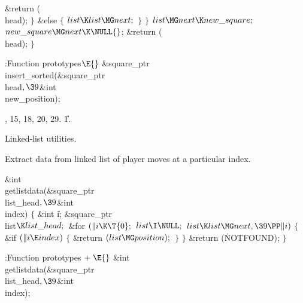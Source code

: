 \&{return} (\\{head});\6
\4${}\}{}$\2\6
\&{else}\5
${}\{{}$\1\6
${}\\{list}\K\\{list}\MG\\{next};{}$\6
\4${}\}{}$\2\6
\4${}\}{}$\2\6
${}\\{list}\MG\\{next}\K\\{new\_square};{}$\6
${}\\{new\_square}\MG\\{next}\K\NULL{}$;\6
\&{return} (\\{head});\6
\4${}\}{}$\2\par
\fi

\B{}:Function prototypes\X${}\E{}$\6
\&{square\_ptr} \\{insert\_sorted}(\&{square\_ptr} \\{head}${},\39{}$\&{int} %
\\{new\_position});\par
{}, 15, 18, 20, 29.
\U1.\fi

Linked-list utilities.

\fi

Extract data from linked list of player moves at a particular index.

\Y\B\&{int} \\{getlistdata}(\&{square\_ptr} \\{list\_head}${},\39{}$\&{int} %
\\{index})\1\1\2\2\6
${}\{{}$\1\6
\&{int} \|i;\6
\&{square\_ptr} \\{list}${}\K\\{list\_head};{}$\7
\&{for} ${}(\|i\K\T{0};{}$ ${}\\{list}\I\NULL;{}$ ${}\\{list}\K\\{list}\MG%
\\{next},\39\PP\|i){}$\5
${}\{{}$\1\6
\&{if} ${}(\|i\E\\{index}){}$\5
${}\{{}$\1\6
\&{return} ${}(\\{list}\MG\\{position});{}$\6
\4${}\}{}$\2\6
\4${}\}{}$\2\6
\&{return} (\.{NOTFOUND});\6
\4${}\}{}$\2\par
\fi

\B{}:Function prototypes\X${}\mathrel+\E{}$\6
\&{int} \\{getlistdata}(\&{square\_ptr} \\{list\_head}${},\39{}$\&{int} %
\\{index});\par
\fi


